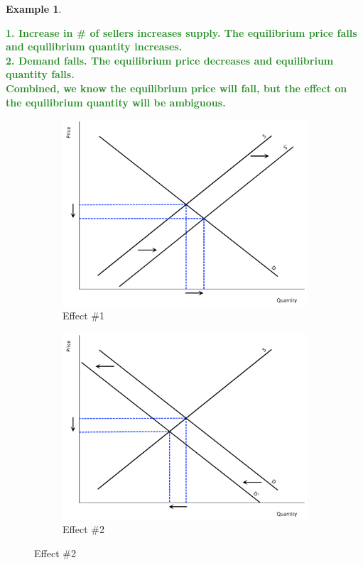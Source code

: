 \documentclass[11pt]{article}\usepackage[]{graphicx}\usepackage[]{color}
\theoremstyle{definition}
\newtheorem{exmp}{Example}[section]
\newcommand{\ddp}[1]{{\textbf{\textcolor{ForestGreen}{#1}}}}
\begin{document}
\begin{exmp}
\begin{enumerate}
		\ddp{1. Increase in \# of sellers increases supply. The equilibrium price falls and equilibrium quantity increases. \\ 
			2. Demand falls. The equilibrium price decreases and equilibrium quantity falls. \\
			Combined, we know the equilibrium price will fall, but the effect on the equilibrium quantity will be ambiguous.}
			\begin{figure}[H]
				\centering
				\caption{Example 4.1.3}
				\begin{subfigure}{.5\textwidth}
					\includegraphics[scale=.25]{plot16.pdf}
					\caption{Effect \#1}
				\end{subfigure}%
				\begin{subfigure}{.5\textwidth}
					\centering
					\includegraphics[scale=.25]{plot17.pdf}
					\caption{Effect \#2}
				\end{subfigure}
			\end{figure}
			
	\end{enumerate}
	\end{exmp}
	
\end{document}
